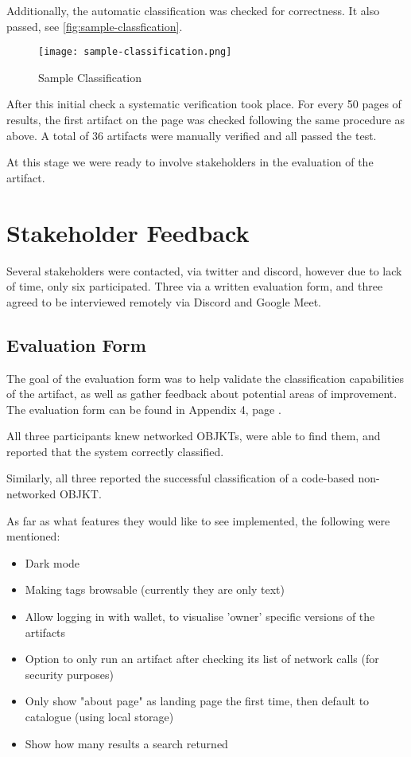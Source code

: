 Additionally, the automatic classification was checked for correctness. It also passed, see \autoref{fig:sample-classfication}.

\begin{figure}[h]
    \centering
    \texttt{[image: sample-classification.png]}
    \caption[Sample Classification]{Sample Classification}
    \label{fig:sample-classfication}
\end{figure}


After this initial check a systematic verification took place. For every 50 pages of results, the first artifact on the page was checked following the same procedure as above. A total of 36 artifacts were manually verified and all passed the test.

At this stage we were ready to involve stakeholders in the evaluation of the artifact.


\section{Stakeholder Feedback}

Several stakeholders were contacted, via twitter and discord, however due to lack of time, only six participated. Three via a written evaluation form, and three agreed to be interviewed remotely via Discord and Google Meet.

\subsection{Evaluation Form}

The goal of the evaluation form was to help validate the classification capabilities of the artifact, as well as gather feedback about potential areas of improvement. The evaluation form can be found in Appendix 4, page \pageref{chap:evalform}.

All three participants knew networked OBJKTs, were able to find them, and reported that the system correctly classified.

Similarly, all three reported the successful classification of a code-based non-networked OBJKT.

As far as what features they would like to see implemented, the following were mentioned:

\begin{itemize}
    \item Dark mode
    \item Making tags browsable (currently they are only text)
    \item Allow logging in with wallet, to visualise 'owner' specific versions of the artifacts
    \item Option to only run an artifact after checking its list of network calls (for security purposes)
    \item Only show "about page" as landing page the first time, then default to catalogue (using local storage)
    \item Show how many results a search returned
\end{itemize}

